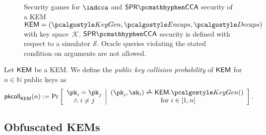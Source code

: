 \begin{figure}
    
    \caption[%
        Security games for $\indcca$ and $\sprcca$ security of a KEM or obfuscated KEM.
    ]{%
        Security games for $\indcca$ and $\sprcca$ security of a KEM~$\KEM = (\kgen, \encaps, \decaps)$ with key space~$\mathcal K$. $\sprcca$ security is defined with respect to a simulator $\mathcal S$. Oracle queries violating the stated condition on arguments are not allowed.
    }
    \label{fig:kem-security}
\end{figure}

\begin{definition}
    \label{def:pk-collisions}
    Let $\mathsf{KEM}$ be a KEM.
    We define the \emph{public key collision probability} of $\mathsf{KEM}$ for $n \in \mathbb{N}$ public keys as
    \[
        \pkcoll{\KEM}(n) := \Pr\left[
            \begin{array}{c}
                \pk_i = \pk_j \\
                \land~ i \neq j
            \end{array}
            \middle|
            \begin{array}{c}
                (\pk_i,\sk_i) \getsr \KEM.\kgen() \\
                \text{ for } i \in [1,n]
            \end{array}
            \right].
    \]
\end{definition}

\subsection{Obfuscated KEMs}

